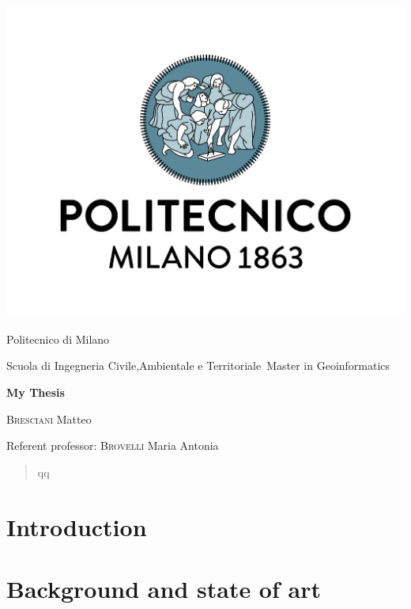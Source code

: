\documentclass[fontsize=12pt,paper=a4,pagesize=auto]{report}
\begin{document}
\begin{titlepage}
	\centering
	\includegraphics[scale = 0.20]{images/polimi.jpg}\par
	{\Large
		Politecnico di Milano\par
		Scuola di Ingegneria Civile,Ambientale e Territoriale\
		Master in Geoinformatics\par}
			\vspace{0.5cm}
	{\huge\bfseries
		My Thesis\\\par}
	\vspace{1cm}
	{\Large
		{\scshape Bresciani} Matteo\par}
	\vfill
	Referent professor: {\scshape Brovelli} Maria Antonia\par
	\vfill
\end{titlepage}




\begin{abstract}

qq
\end{abstract}
\tableofcontents

\chapter{Introduction}
 

\chapter{Background and state of art}

\end{document}
